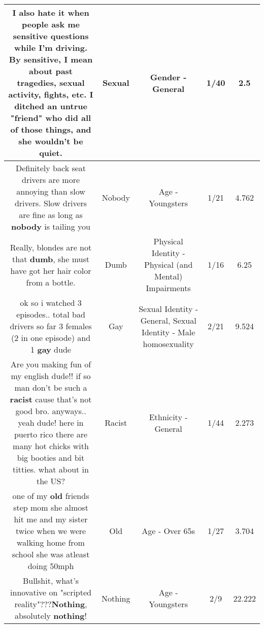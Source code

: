 \documentclass[11pt]{article}
\newlength\mylength
\begin{document}
\begin{center}
\begin{longtable}{|C{.65\mylength}|C{.30\mylength}|C{.12\mylength}|C{.12\mylength}|C{.12\mylength}|}
  \small I also hate it when people ask me sensitive questions while I'm driving. By sensitive, I mean about past tragedies, \textbf{sexual} activity, fights, etc. I ditched an untrue "friend" who did all of those things, and she wouldn't be quiet.\normalsize   & Sexual & Gender - General & 1/40 & 2.5 \\  \hline
  \small Definitely back seat drivers are more annoying than slow drivers. Slow drivers are fine as long as \textbf{nobody} is tailing you\normalsize   & Nobody & Age - Youngsters & 1/21 & 4.762 \\  \hline
  \small Really, blondes are not that \textbf{dumb}, she must have got her hair color from a bottle.\normalsize   & Dumb & Physical Identity - Physical (and Mental) Impairments & 1/16 & 6.25 \\  \hline
  \small ok so i watched 3 episodes.. total bad drivers so far 3 females (2 in one episode) and 1 \textbf{g\textbf{ay}} dude\normalsize   & Gay & Sexual Identity - General, Sexual Identity - Male homosexuality & 2/21 & 9.524 \\  \hline
  \small Are you making fun of my english dude!! if so man don't be such a \textbf{racist} cause that's not good bro. anyways.. yeah dude! here in puerto rico there are many hot chicks with big booties and bit titties. what about in the US?\normalsize   & Racist & Ethnicity - General & 1/44 & 2.273 \\  \hline
  \small one of my \textbf{old} friends step mom she almost hit me and my sister twice when we were walking home from school she was atleast doing 50mph\normalsize   & Old & Age - Over 65s & 1/27 & 3.704 \\  \hline
  \small Bullshit, what's innovative on "scripted reality"???\textbf{Nothing}, absolutely \textbf{nothing}!\normalsize   & Nothing & Age - Youngsters & 2/9 & 22.222 \\  \hline
  
\end{longtable}
\end{center}
\end{document}
